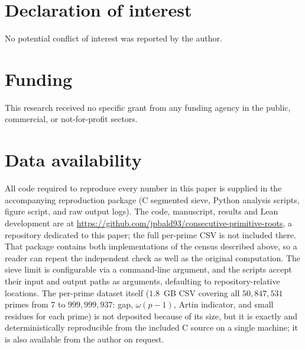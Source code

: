 \documentclass[11pt]{amsart}
\theoremstyle{definition}
\begin{document}
\section*{Declaration of interest}
No potential conflict of interest was reported by the author.

\section*{Funding}
This research received no specific grant from any funding agency in the
public, commercial, or not-for-profit sectors.

\section*{Data availability}
All code required to reproduce every number in this paper is supplied in the
accompanying reproduction package (C segmented sieve, Python analysis scripts,
figure script, and raw output logs). The code, manuscript, results and Lean
development are at
\url{https://github.com/jpbald93/consecutive-primitive-roots}, a repository
dedicated to this paper; the full per-prime CSV is not included there. That
package contains both implementations of the census described above, so a
reader can repeat the independent check as well as the original computation.
The sieve limit is configurable via a command-line argument, and the scripts
accept their input and output paths as arguments, defaulting to
repository-relative locations.
The per-prime dataset itself ($1.8$~GB CSV covering all $50{,}847{,}531$
primes from $7$ to $999{,}999{,}937$: gap, $\omega(p-1)$, Artin indicator,
and small residues for each prime) is not deposited because of its size, but
it is exactly and deterministically reproducible from the included C source on
a single machine; it is also available from the author on request.
\end{document}
